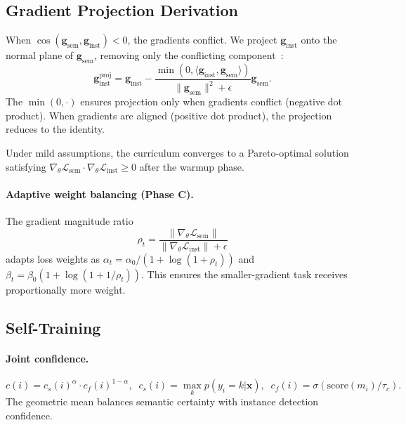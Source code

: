 \documentclass[10pt,twocolumn,letterpaper]{article}
\newcommand{\lsem}{\mathcal{L}_{\text{sem}}}
\newcommand{\linst}{\mathcal{L}_{\text{inst}}}
\begin{document}
\subsection{Gradient Projection Derivation}
\label{sec:supp_gradient}

When $\cos(\mathbf{g}_{\text{sem}}, \mathbf{g}_{\text{inst}}) < 0$, the gradients conflict. We project $\mathbf{g}_{\text{inst}}$ onto the normal plane of $\mathbf{g}_{\text{sem}}$, removing only the conflicting component~\cite{yu2020pcgrad}:
\begin{equation}
\mathbf{g}_{\text{inst}}^{\text{proj}} = \mathbf{g}_{\text{inst}} - \frac{\min(0, \langle \mathbf{g}_{\text{inst}}, \mathbf{g}_{\text{sem}} \rangle)}{\|\mathbf{g}_{\text{sem}}\|^2 + \epsilon} \mathbf{g}_{\text{sem}}.
\end{equation}
The $\min(0, \cdot)$ ensures projection only when gradients conflict (negative dot product). When gradients are aligned (positive dot product), the projection reduces to the identity.

Under mild assumptions, the curriculum converges to a Pareto-optimal solution satisfying $\nabla_\theta \lsem \cdot \nabla_\theta \linst \geq 0$ after the warmup phase.

\paragraph{Adaptive weight balancing (Phase C).}
The gradient magnitude ratio
\begin{equation}
\rho_t = \frac{\|\nabla_\theta \lsem\|}{\|\nabla_\theta \linst\| + \epsilon}
\end{equation}
adapts loss weights as $\alpha_t = \alpha_0 / (1 + \log(1 + \rho_t))$ and $\beta_t = \beta_0 (1 + \log(1 + 1/\rho_t))$. This ensures the smaller-gradient task receives proportionally more weight.


\subsection{Self-Training}
\label{sec:supp_self_training}

\paragraph{Joint confidence.}
\begin{equation}
c(i) = c_s(i)^\alpha \cdot c_f(i)^{1-\alpha}, \;\; c_s(i) = \max_k p(y_i = k | \mathbf{x}), \;\; c_f(i) = \sigma(\text{score}(m_i) / \tau_c).
\end{equation}
The geometric mean balances semantic certainty with instance detection confidence.
\end{document}
